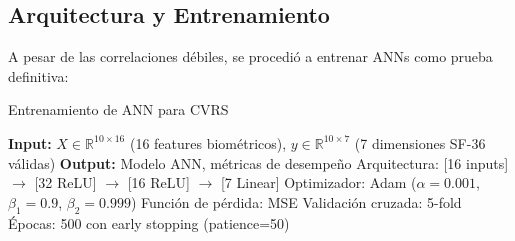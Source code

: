 \documentclass[12pt,letterpaper,twoside]{report}
\newcommand{\R}{\mathbb{R}}
\begin{document}
\subsection{Arquitectura y Entrenamiento}

A pesar de las correlaciones débiles, se procedió a entrenar ANNs como prueba definitiva:

\begin{algorithm}[H]
\caption{Entrenamiento de ANN para CVRS}
\label{alg:ann_training}
\begin{algorithmic}[1]
\State \textbf{Input:} $X \in \R^{10 \times 16}$ (16 features biométricos), $y \in \R^{10 \times 7}$ (7 dimensiones SF-36 válidas)
\State \textbf{Output:} Modelo ANN, métricas de desempeño
\State
\State Arquitectura: [16 inputs] $\to$ [32 ReLU] $\to$ [16 ReLU] $\to$ [7 Linear]
\State Optimizador: Adam ($\alpha=0.001$, $\beta_1=0.9$, $\beta_2=0.999$)
\State Función de pérdida: MSE
\State Validación cruzada: 5-fold
\State Épocas: 500 con early stopping (patience=50)
\end{algorithmic}
\end{algorithm}

\end{document}
